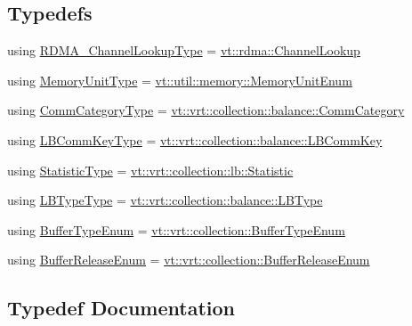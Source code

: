 \subsection*{Typedefs}
\begin{DoxyCompactItemize}
\item 
using \hyperlink{namespacestd_a30c426bd959ae4c3814e36d01efe9df7}{R\+D\+M\+A\+\_\+\+Channel\+Lookup\+Type} = \hyperlink{structvt_1_1rdma_1_1_channel_lookup}{vt\+::rdma\+::\+Channel\+Lookup}
\item 
using \hyperlink{namespacestd_ad7105ed4fa94bea7fce7b09cea2c7165}{Memory\+Unit\+Type} = \hyperlink{namespacevt_1_1util_1_1memory_a64df3d84293b34009f78e2a1db2f9bb6}{vt\+::util\+::memory\+::\+Memory\+Unit\+Enum}
\item 
using \hyperlink{namespacestd_a4dd27d43e4725feae37124932561af56}{Comm\+Category\+Type} = \hyperlink{namespacevt_1_1vrt_1_1collection_1_1balance_a9cc6c6884ca0416dae824e9204093c57}{vt\+::vrt\+::collection\+::balance\+::\+Comm\+Category}
\item 
using \hyperlink{namespacestd_a3a6802ab62d3595b44a8463f8e654c31}{L\+B\+Comm\+Key\+Type} = \hyperlink{structvt_1_1vrt_1_1collection_1_1balance_1_1_l_b_comm_key}{vt\+::vrt\+::collection\+::balance\+::\+L\+B\+Comm\+Key}
\item 
using \hyperlink{namespacestd_a77b0310083adc8639f9659f5c8b3cf0d}{Statistic\+Type} = \hyperlink{namespacevt_1_1vrt_1_1collection_1_1lb_af0e20ef9afee77295053aa83bf1348b1}{vt\+::vrt\+::collection\+::lb\+::\+Statistic}
\item 
using \hyperlink{namespacestd_ae3c14c256fabd8bbed83c439b367c3d8}{L\+B\+Type\+Type} = \hyperlink{namespacevt_1_1vrt_1_1collection_1_1balance_ac4f99693509affcc67db182d4aad9b5c}{vt\+::vrt\+::collection\+::balance\+::\+L\+B\+Type}
\item 
using \hyperlink{namespacestd_ab5492c80007bc5a00cc49a954c809d6f}{Buffer\+Type\+Enum} = \hyperlink{namespacevt_1_1vrt_1_1collection_a1b1b082e2ff4e9e5d1b7227acd78db3f}{vt\+::vrt\+::collection\+::\+Buffer\+Type\+Enum}
\item 
using \hyperlink{namespacestd_a881b600944be212a7a1b9ac199fb2f88}{Buffer\+Release\+Enum} = \hyperlink{namespacevt_1_1vrt_1_1collection_a2545006e681bacc1f00be9d5d6bdc8fa}{vt\+::vrt\+::collection\+::\+Buffer\+Release\+Enum}
\end{DoxyCompactItemize}


\subsection{Typedef Documentation}
\mbox{\label{namespacestd_a881b600944be212a7a1b9ac199fb2f88}} 
